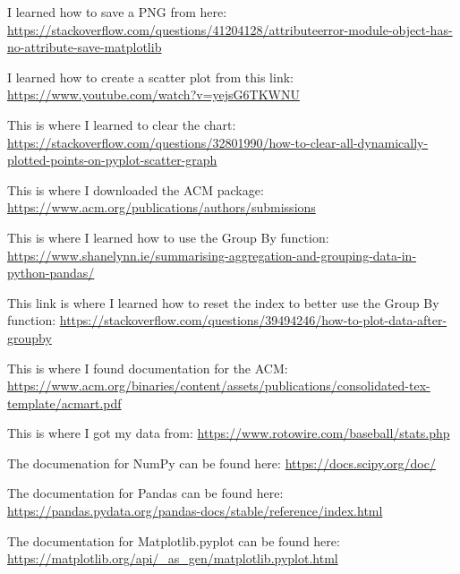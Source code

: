 \documentclass{acmart}
\begin{document}
\begin{thebibliography}{200}

 I learned how to save a PNG from here: \url{https://stackoverflow.com/questions/41204128/attributeerror-module-object-has-no-attribute-save-matplotlib}

 I learned how to create a scatter plot from this link: \url{https://www.youtube.com/watch?v=yejsG6TKWNU}

 This is where I learned to clear the chart: \url{https://stackoverflow.com/questions/32801990/how-to-clear-all-dynamically-plotted-points-on-pyplot-scatter-graph}

 This is where I downloaded the ACM package: \url{https://www.acm.org/publications/authors/submissions}

 This is where I learned how to use the Group By function: \url{https://www.shanelynn.ie/summarising-aggregation-and-grouping-data-in-python-pandas/}

 This link is where I learned how to reset the index to better use the Group By function: \url{https://stackoverflow.com/questions/39494246/how-to-plot-data-after-groupby}

 This is where I found documentation for the ACM: \url{https://www.acm.org/binaries/content/assets/publications/consolidated-tex-template/acmart.pdf}

 This is where I got my data from: \url{https://www.rotowire.com/baseball/stats.php}

 The documenation for NumPy can be found here: \url{https://docs.scipy.org/doc/}

 The documentation for Pandas can be found here: \url{https://pandas.pydata.org/pandas-docs/stable/reference/index.html}

 The documentation for Matplotlib.pyplot can be found here: \url{https://matplotlib.org/api/_as_gen/matplotlib.pyplot.html}

\end{thebibliography}
\end{document}
